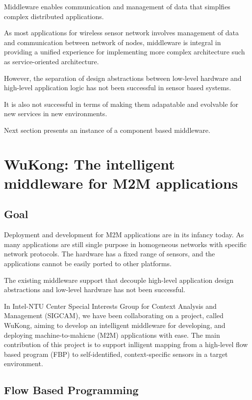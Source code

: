 Middleware enables communication and management of data that simplfies 
complex distributed applications.

As most applications for wireless sensor network involves management of data and
communication between network of nodes, middleware is integral in providing
a unified experience for implementing more complex architecture such as 
service-oriented architecture.

However, the separation of design abstractions between low-level hardware and
high-level application logic has not been successful in sensor based systems.

It is also not successful in terms of making them adapatable and evolvable 
for new services in new environments.

Next section presents an instance of a component based middleware.


\section{WuKong: The intelligent middleware for M2M applications}

\subsection{Goal}

Deployment and development for M2M applications are in its infancy today. As
many applications are still single purpose in homogeneous networks with
specific network protocols. The hardware has a fixed range of sensors, and the
applications cannot be easily ported to other platforms.

The existing middleware support that decouple high-level application design
abstractions and low-level hardware has not been successful.

In Intel-NTU Center Special Interests Group for Context Analysis and Management 
(SIGCAM), we have been collaborating on a project, called WuKong, aiming to develop 
an intelligent middleware for developing, and deploying machine-to-mahicne 
(M2M) applications with ease. The main contribution of this project is to support
inlligent mapping from a high-level flow based program (FBP) to
self-identified, context-specific sensors in a target
environment\cite{Reijers}.

\subsection{Flow Based Programming}

